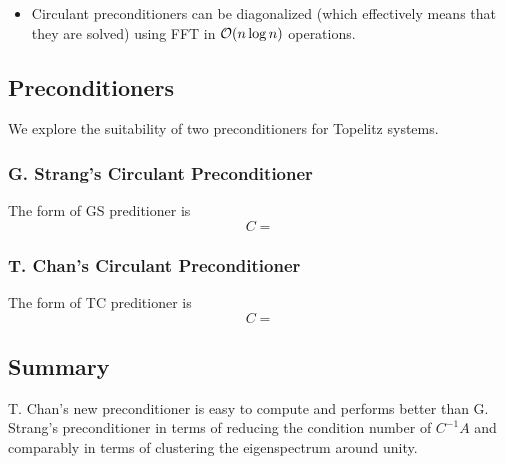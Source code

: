 \documentclass{article}
\begin{document}
\begin{itemize}
\item Circulant preconditioners can be diagonalized (which
  effectively means that they are solved) using FFT in ${\cal{O}}(n
  \log n)$ operations.
\end{itemize}


\subsection{Preconditioners}

We explore the suitability of two preconditioners for Topelitz
systems.

\subsubsection{G. Strang's Circulant Preconditioner}

The form of GS preditioner is $$ C = $$

\subsubsection{T. Chan's Circulant Preconditioner}

The form of TC preditioner is $$ C = $$

\subsection{Summary}

T. Chan's new preconditioner is
easy to compute and performs better than G. Strang's preconditioner
in terms of reducing the condition number of $C^{-1}A$ and
comparably in terms of clustering the eigenspectrum around unity.


\clearpage
\end{document}
